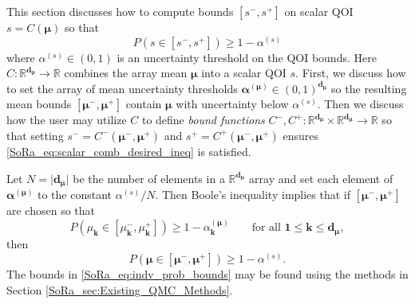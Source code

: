 \documentclass[graybox]{svmult}
\begin{document}
This section discusses how to compute bounds $[s^-,s^+]$ on scalar QOI $s = C(\boldsymbol{\mu})$ so that 
\begin{equation}
    P(s \in [s^-,s^+]) \geq 1-\alpha^{(s)}
    \label{SoRa_eq:scalar_comb_desired_ineq}
\end{equation}
where $\alpha^{(s)} \in (0,1)$ is an uncertainty threshold on the QOI bounds. Here $C: \mathbb{R}^{\boldsymbol{d}_{\boldsymbol{\mu}}} \to \mathbb{R}$ combines the array mean $\boldsymbol{\mu}$ into a scalar QOI $s$. First, we discuss how to set the array of mean uncertainty thresholds $\boldsymbol{\alpha}^{(\boldsymbol{\mu})} \in (0,1)^{\boldsymbol{d}_{\boldsymbol{\mu}}}$ so the resulting mean bounds $[\boldsymbol{\mu}^-,\boldsymbol{\mu}^+]$ contain $\boldsymbol{\mu}$ with uncertainty below $\alpha^{(s)}$. Then we discuss how the user may utilize $C$ to define \emph{bound functions} $C^-,C^+: \mathbb{R}^{\boldsymbol{d}_{\boldsymbol{\mu}}} \times \mathbb{R}^{\boldsymbol{d}_{\boldsymbol{\mu}}} \to \mathbb{R}$ so that setting $s^- = C^-(\boldsymbol{\mu}^-,\boldsymbol{\mu}^+)$ and $s^+ = C^+(\boldsymbol{\mu}^-,\boldsymbol{\mu}^+)$ ensures \eqref{SoRa_eq:scalar_comb_desired_ineq} is satisfied.

Let $N = \lvert \boldsymbol{d}_{\boldsymbol{\mu}} \rvert$ be the number of elements in a $\mathbb{R}^{\boldsymbol{d}_{\boldsymbol{\mu}}}$ array and set each element of $\boldsymbol{\alpha}^{(\boldsymbol{\mu})}$ to the constant $\alpha^{(s)}/ N$. Then Boole's inequality \cite{boole1847mathematical} implies that if $[\boldsymbol{\mu}^-,\boldsymbol{\mu}^+]$ are chosen so that
\begin{equation}
    P(\mu_{\boldsymbol{k}} \in [\mu_{\boldsymbol{k}}^-,\mu_{\boldsymbol{k}}^+]) \geq 1-\alpha_{\boldsymbol{k}}^{(\boldsymbol{\mu})}  \qquad \text{for all }\boldsymbol{1} \leq \boldsymbol{k} \leq \boldsymbol{d}_{\boldsymbol{\mu}},
    \label{SoRa_eq:indv_prob_bounds}
\end{equation}
then  
\begin{equation}
    P(\boldsymbol{\mu} \in [\boldsymbol{\mu}^-,\boldsymbol{\mu}^+]) \geq 1-\alpha^{(s)}.
    \label{SoRa_eq:indv_prob_bounds_all}
\end{equation}
The bounds in \eqref{SoRa_eq:indv_prob_bounds} may be found using the methods in Section \ref{SoRa_sec:Existing_QMC_Methods}.
\end{document}
